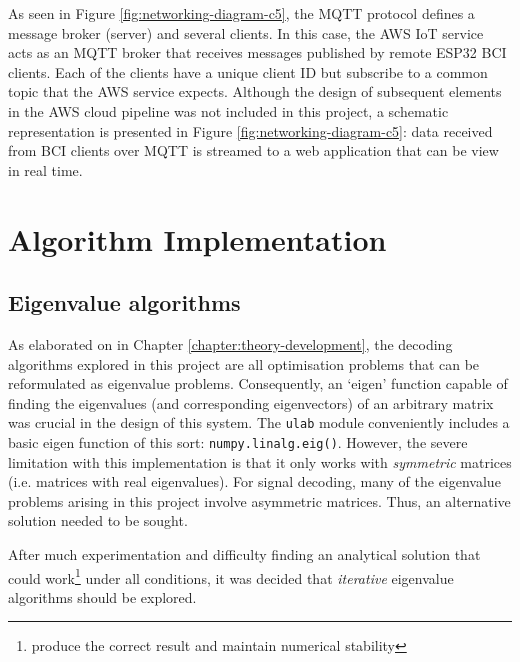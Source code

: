 As seen in Figure \ref{fig:networking-diagram-c5}, the MQTT protocol defines a message broker (server) and several clients. In this case, the AWS IoT service acts as an MQTT broker that receives messages published by remote ESP32 BCI clients. Each of the clients have a unique client ID but subscribe to a common topic that the AWS service expects. Although the design of subsequent elements in the AWS cloud pipeline was not included in this project, a schematic representation is presented in Figure \ref{fig:networking-diagram-c5}: data received from BCI clients over MQTT is streamed to a web application that can be view in real time.


\section{Algorithm Implementation}

\subsection{Eigenvalue algorithms}
As elaborated on in Chapter \ref{chapter:theory-development}, the decoding algorithms explored in this project are all optimisation problems that can be reformulated as eigenvalue problems. Consequently, an `eigen' function capable of finding the eigenvalues (and corresponding eigenvectors) of an arbitrary matrix was crucial in the design of this system. The \texttt{ulab} module conveniently includes a basic eigen function of this sort: \texttt{numpy.linalg.eig()}. However, the severe limitation with this implementation is that it only works with \textit{symmetric} matrices (i.e. matrices with real eigenvalues). For signal decoding, many of the eigenvalue problems arising in this project involve asymmetric matrices. Thus, an alternative solution needed to be sought. 

After much experimentation and difficulty finding an analytical solution that could work\footnote{produce the correct result and maintain numerical stability} under all conditions, it was decided that \textit{iterative} eigenvalue algorithms should be explored. 

